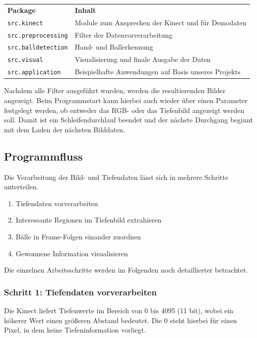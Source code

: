 \documentclass[12pt,a4paper,ngerman]{scrartcl}
\begin{document}
\begin{tabular}{ll}
\textbf{Package} & \textbf{Inhalt} \vspace{0.1cm} \\
{\lstinline!src.kinect!} & Module zum Ansprechen der Kinect und für Demodaten \\
{\lstinline!src.preprocessing!} & Filter der Datenvorverarbeitung\\
{\lstinline!src.balldetection!} & Hand- und Ballerkennung\\
{\lstinline!src.visual!} & Visualisierung und finale Ausgabe der Daten\\
{\lstinline!src.application!} & Beispielhafte Anwendungen auf Basis unseres Projekts
\end{tabular}

Nachdem alle Filter ausgeführt wurden, werden die resultierenden Bilder angezeigt. Beim Programmstart kann hierbei auch wieder über einen Parameter festgelegt werden, ob entweder das RGB- oder das Tiefenbild angezeigt werden soll. Damit ist ein Schleifendurchlauf beendet und der nächste Durchgang beginnt mit dem Laden der nächsten Bilddaten.

\subsection{Programmfluss}
\label{sec:programmfluss}

Die Verarbeitung der Bild- und Tiefendaten lässt sich in mehrere Schritte unterteilen.

\begin{enumerate}
	\item Tiefendaten vorverarbeiten
	\item Interessante Regionen im Tiefenbild extrahieren
	\item Bälle in Frame-Folgen einander zuordnen
	\item Gewonnene Information visualisieren
\end{enumerate}

Die einzelnen Arbeitsschritte werden im Folgenden noch detaillierter betrachtet.

\subsubsection{Schritt 1: Tiefendaten vorverarbeiten}\label{sec:preprocess}

Die Kinect liefert Tiefenwerte im Bereich von 0 bis 4095 (11 bit), wobei ein höherer Wert
einen größeren Abstand bedeutet. Die 0 steht hierbei für einen Pixel, in dem keine
Tiefeninformation vorliegt.
\end{document}

